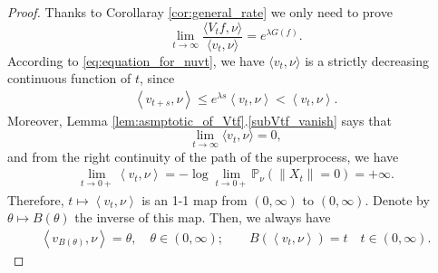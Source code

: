 \documentclass[12pt,a4paper]{amsart}
\numberwithin{equation}{section}
\theoremstyle{plain}
\theoremstyle{definition}
\begin{document}
\begin{proof}
	Thanks to Corollaray \ref{cor:general_rate} we only need to prove
  \begin{equation}\label{eq:spec_ratio}
    \lim_{t\rightarrow\infty}\frac{\langle V_tf,\nu\rangle }{\langle v_t,\nu\rangle }=e^{\lambda G(f)}.
  \end{equation}
  According to \eqref{eq:equation_for_nuvt}, we have $\langle v_t,\nu\rangle$ is a strictly decreasing continuous function of $t$, since
  \begin{align}\label{eq:monotone}
    \left\langle v_{t+s},\nu \right\rangle 
\leq e^{\lambda s} \left\langle v_{t},\nu \right\rangle
< \left\langle v_t,\nu \right\rangle.  
\end{align}
Moreover, Lemma \ref{lem:asmptotic_of_Vtf}.\eqref{subVtf_vanish} says that
  \[
\lim_{t\rightarrow\infty}\langle v_t,\nu\rangle =0,
  \]
and from the right continuity of the path of the superprocess, we have
\begin{align}
  \lim_{t\to 0+} \left\langle v_t,\nu \right\rangle 
  = - \log \lim_{t\to 0+} \mathbb P_\nu\left( \|X_t\| = 0 \right)
= +\infty.
\end{align}
Therefore, $t \mapsto \left\langle v_t,\nu \right\rangle$ is an 1-1 map from $(0,\infty)$ to $(0,\infty)$. 
Denote by $\theta \mapsto B(\theta)$ the inverse of this map.
Then, we always have
\begin{align}
  \left\langle v_{B(\theta)},\nu \right\rangle 
  = \theta,
\quad \theta \in (0,\infty);
\qquad 
  B\left( \left\langle v_t,\nu \right\rangle \right) 
= t
\quad t\in (0,\infty).
\end{align}


\end{proof}
\end{document}
